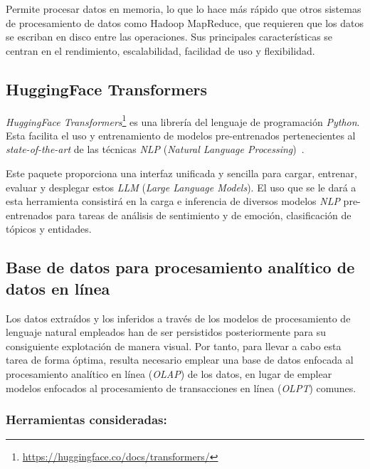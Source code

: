 Permite procesar datos en memoria, lo que lo hace más rápido que otros sistemas de procesamiento de datos como Hadoop MapReduce, que requieren que los datos se escriban en disco entre las operaciones. Sus principales características se centran en el rendimiento, escalabilidad, facilidad de uso y flexibilidad.

\subsection{HuggingFace Transformers}

\textit{HuggingFace Transformers}\footnote{\url{https://huggingface.co/docs/transformers/}} es una librería del lenguaje de programación \textit{Python}. Esta facilita el uso y entrenamiento de modelos pre-entrenados pertenecientes al \textit{state-of-the-art} de las técnicas \textit{NLP} (\textit{Natural Language Processing})~\cite{huggingfaceTransformers}.

Este paquete proporciona una interfaz unificada y sencilla para cargar, entrenar, evaluar y desplegar estos \textit{LLM} (\textit{Large Language Models}). El uso que se le dará a esta herramienta consistirá  en la carga e inferencia de diversos modelos \textit{NLP} pre-entrenados para tareas de análisis de sentimiento y de emoción, clasificación de tópicos y entidades.


\subsection{Base de datos para procesamiento analítico de datos en línea}

Los datos extraídos y los inferidos a través de los modelos de procesamiento de lenguaje natural empleados han de ser persistidos posteriormente para su consiguiente explotación de manera visual. Por tanto, para llevar a cabo esta tarea de forma óptima, resulta necesario emplear una base de datos enfocada al procesamiento analítico en línea (\textit{OLAP}) de los datos, en lugar de emplear modelos enfocados al procesamiento de transacciones en línea (\textit{OLPT}) comunes.

\subsubsection{Herramientas consideradas:}

